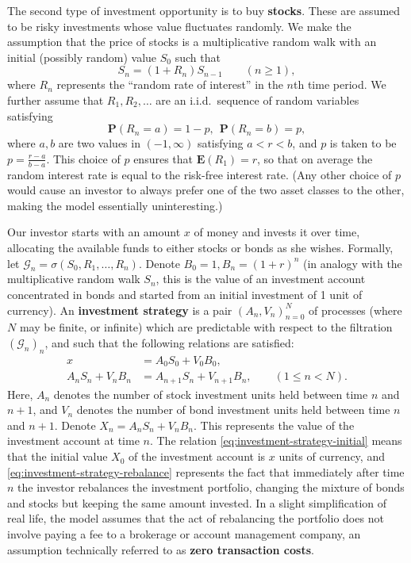 \documentclass[12pt]{article}
\newcommand{\prob}{\mathbf{P}}
\newcommand{\expec}{\mathbf{E}}
\theoremstyle{example}
\begin{document}
The second type of investment opportunity is to buy \textbf{stocks}. These are assumed to be risky investments whose value fluctuates randomly. We make the assumption that the price of stocks is a multiplicative random walk with an initial (possibly random) value $S_0$ such that
$$ S_n = (1+R_n) S_{n-1} \qquad (n\ge1), $$
where $R_n$ represents the ``random rate of interest'' in the $n$th time period. We further assume that $R_1,R_2,\ldots$ are an i.i.d.\ sequence of random variables satisfying
$$ \prob(R_n = a) = 1-p, \ \ \prob(R_n = b) = p, $$
where $a,b$ are two values in $(-1,\infty)$ satisfying $a<r<b$, and $p$ is taken to be $p=\frac{r-a}{b-a}$. This choice of $p$
ensures that $\expec(R_1) = r$, so that on average the random interest rate is equal to the risk-free interest rate. (Any other choice of $p$ would cause an investor to always prefer one of the two asset classes to the other, making the model essentially uninteresting.)

Our investor starts with an amount $x$ of money and invests it over time, allocating the available funds to either stocks or bonds as she wishes. Formally, let $\mathcal{G}_n = \sigma(S_0,R_1,\ldots,R_n)$. Denote $B_0=1, B_n=(1+r)^n$ (in analogy with the multiplicative random walk $S_n$, this is the value of an investment account concentrated in bonds and started from an initial investment of 1 unit of currency).
An \textbf{investment strategy} is a pair $(A_n, V_n)_{n=0}^N$ of processes (where $N$ may be finite, or infinite) which are predictable with respect to the filtration $(\mathcal{G}_n)_n$, and such that the following relations are satisfied:
\begin{align}
x &= A_0 S_0 + V_0 B_0, \label{eq:investment-strategy-initial} \\
A_n S_n + V_n B_n &= A_{n+1} S_n + V_{n+1} B_n, \qquad (1\le n< N).
\label{eq:investment-strategy-rebalance}
\end{align}
Here, $A_n$ denotes the number of stock investment units held between time $n$ and $n+1$, and $V_n$ denotes the number of bond investment units held between time $n$ and $n+1$. Denote $X_n = A_n S_n + V_n B_n$. This represents the value of the investment account at time $n$. The relation \eqref{eq:investment-strategy-initial} means that the initial value $X_0$ of the investment account is $x$ units of currency, and \eqref{eq:investment-strategy-rebalance} represents the fact that immediately after time $n$ the investor rebalances the investment portfolio, changing the mixture of bonds and stocks but keeping the same amount invested. In a slight simplification of real life, the model assumes that the act of rebalancing the portfolio does not involve paying a fee to a brokerage or account management company, an assumption technically referred to as \textbf{zero transaction costs}.
\end{document}
